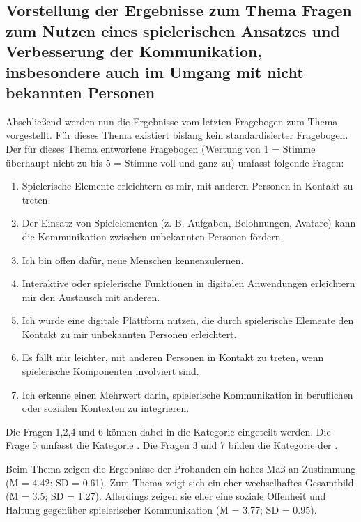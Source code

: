 \subsection{Vorstellung der Ergebnisse zum Thema Fragen zum Nutzen eines spielerischen Ansatzes und Verbesserung der Kommunikation, insbesondere auch im Umgang mit nicht bekannten Personen}

Abschließend werden nun die Ergebnisse vom letzten Fragebogen zum Thema  vorgestellt. Für dieses Thema existiert bislang kein standardisierter Fragebogen. Der für dieses Thema entworfene Fragebogen (Wertung von 1 = Stimme überhaupt nicht zu bis 5 = Stimme voll und ganz zu) umfasst folgende Fragen:
\begin{enumerate}
    \item Spielerische Elemente erleichtern es mir, mit anderen Personen in Kontakt zu treten.
    \item Der Einsatz von Spielelementen (z. B. Aufgaben, Belohnungen, Avatare) kann die Kommunikation zwischen unbekannten Personen fördern.
    \item Ich bin offen dafür, neue Menschen kennenzulernen.
    \item Interaktive oder spielerische Funktionen in digitalen Anwendungen erleichtern mir den Austausch mit anderen.
    \item Ich würde eine digitale Plattform nutzen, die durch spielerische Elemente den Kontakt zu mir unbekannten Personen erleichtert.
    \item Es fällt mir leichter, mit anderen Personen in Kontakt zu treten, wenn spielerische Komponenten involviert sind.
    \item Ich erkenne einen Mehrwert darin, spielerische Kommunikation in beruflichen oder sozialen Kontexten zu integrieren.
\end{enumerate}

Die Fragen 1,2,4 und 6 können dabei in die Kategorie  eingeteilt werden. Die Frage 5 umfasst die Kategorie . Die Fragen 3 und 7 bilden die Kategorie der .

Beim Thema  zeigen die Ergebnisse der Probanden ein hohes Maß an Zustimmung (M = 4.42: SD = 0.61). Zum Thema  zeigt sich ein eher wechselhaftes Gesamtbild (M = 3.5; SD = 1.27). Allerdings zeigen sie eher eine soziale Offenheit und Haltung gegenüber spielerischer Kommunikation (M = 3.77; SD = 0.95).

